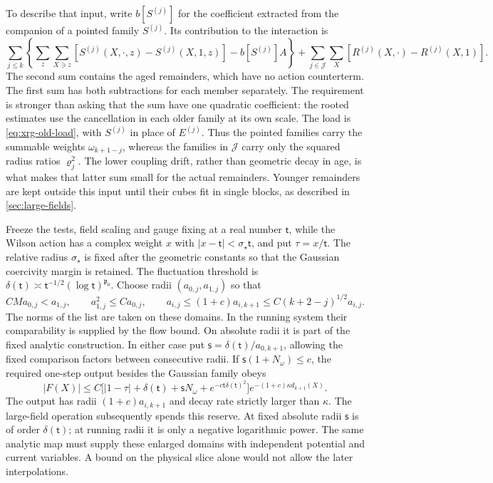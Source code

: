 \documentclass[11pt,letterpaper,reqno]{amsart}
\theoremstyle{definition}
\theoremstyle{remark}
\begin{document}
To describe that input, write $b[S^{(j)}]$ for the coefficient extracted
from the companion of a pointed family $S^{(j)}$. Its contribution to
the interaction is
\begin{equation}\label{eq:rg-list-interaction}
 \sum_{j\le k}\left\{
   \sum_z\sum_{X\ni z}
     [S^{(j)}(X,\cdot,z)-S^{(j)}(X,1,z)]
                      -b[S^{(j)}]A\right\}
 +\sum_{j\in\mathcal J}\sum_X
                  [R^{(j)}(X,\cdot)-R^{(j)}(X,1)].
\end{equation}
The second sum contains the aged remainders, which have no action
counterterm. The first sum has both subtractions for each member
separately. The requirement is stronger than asking that the sum have
one quadratic coefficient: the rooted estimates use the cancellation
in each older family at its own scale. The load is
\eqref{eq:xrg-old-load}, with $S^{(j)}$ in place of $E^{(j)}$.
Thus the pointed families carry the summable weights
$\omega_{k+1-j}$, whereas the families in $\mathcal J$ carry only
the squared radius ratios $\varrho_j^2$. The lower coupling drift,
rather than geometric decay in age, is what makes that latter sum
small for the actual remainders. Younger remainders are kept outside
this input until their cubes fit in single blocks, as described in
\cref{sec:large-fields}.

Freeze the tests, field scaling and gauge fixing at a real number
$\mathsf t$, while the Wilson action has a complex weight $x$ with
$|x-\mathsf t|<\sigma_\star\mathsf t$, and put $\tau=x/\mathsf t$.
The relative radius $\sigma_\star$ is fixed after the geometric
constants so that the Gaussian coercivity margin is retained.
The fluctuation threshold is
$\delta(\mathsf t)\asymp\mathsf t^{-1/2}
(\log\mathsf t)^{\mathfrak p_0}$. Choose radii
$(a_{0,j},a_{1,j})$ so that
\[
 CMa_{0,j}<a_{1,j},\qquad a_{1,j}^2\le Ca_{0,j},\qquad
 a_{i,j}\le(1+c)a_{i,k+1}
       \le C(k+2-j)^{1/2}a_{i,j}.
\]
The norms of the list are taken on these domains. In the running
system their comparability is supplied by the flow bound. On absolute
radii it is part of the fixed analytic construction. In either case
put $\mathsf s=\delta(\mathsf t)/a_{0,k+1}$, allowing the fixed
comparison factors between consecutive radii. If
$\mathsf s(1+N_\omega)\le c$, the required one-step output besides
the Gaussian family obeys
\begin{equation}\label{eq:mrg-list-step}
 |F(X)|\le C\big[|1-\tau|+\delta(\mathsf t)
      +\mathsf sN_\omega+e^{-c\mathsf t\delta(\mathsf t)^2}\big]
                    e^{-(1+c)\kappa d_{k+1}(X)}.
\end{equation}
The output has radii $(1+c)a_{i,k+1}$ and decay rate strictly larger
than $\kappa$. The large-field operation subsequently spends this
reserve. At fixed absolute radii $\mathsf s$ is of order
$\delta(\mathsf t)$; at running radii it is only a negative
logarithmic power. The same analytic map must supply these enlarged
domains with independent potential and current variables. A bound on
the physical slice alone would not allow the later interpolations.
\end{document}
